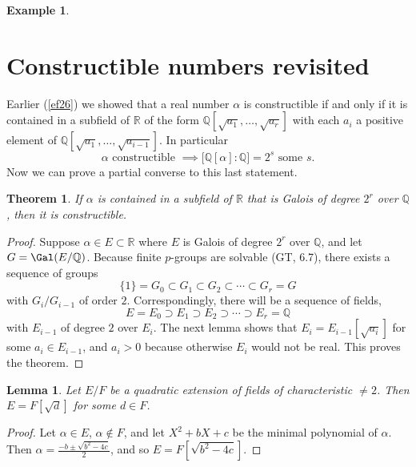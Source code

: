 \documentclass[a4paper,11pt,final,openany]{memoir}
\newtheorem{lemma}[X]{Lemma}
\newtheorem{theorem}[X]{Theorem}
\newtheorem{example}[X]{Example}
\theoremstyle{nonumberplain}
\newtheorem{proof}{Proof.}
\begin{document}
\begin{example}
\end{example}

\section{Constructible numbers revisited}

Earlier (\ref{ef26}) we showed that a real number $\alpha$ is constructible%
if and only if it is contained in a subfield of $\mathbb{R}{}$ of the form
$\mathbb{Q}[\sqrt{a_{1}},\ldots,\sqrt{a_{r}}]$ with each $a_{i}$ a positive
element of $\mathbb{Q}{}[\sqrt{a_{1}},\ldots,\sqrt{a_{i-1}}]$. In particular
\begin{equation}
\alpha\text{\ constructible }\implies\lbrack\mathbb{Q}[\alpha]\colon
\mathbb{Q}]=2^{s}\text{\ some }s. \label{e35}%
\end{equation}
Now we can prove a partial converse to this last statement.

\begin{theorem}
\label{ft22}%
%
If $\alpha$ is contained in a subfield of $\mathbb{R}{}$ that is Galois of
degree $2^{r}$ over $\mathbb{Q}$, then it is constructible.
\end{theorem}

\begin{proof}
Suppose $\alpha\in E\subset\mathbb{R}{}$ where $E$ is Galois of degree $2^{r}$
over $\mathbb{Q}$, and let $G=\Gal(E/\mathbb{Q})$. Because finite $p$-groups
are solvable (GT, 6.7), there exists a sequence of groups
\[
\{1\}=G_{0}\subset G_{1}\subset G_{2}\subset\cdots\subset G_{r}=G
\]
with $G_{i}/G_{i-1}$ of order $2$. Correspondingly, there will be a sequence
of fields,
\[
E=E_{0}\supset E_{1}\supset E_{2}\supset\cdots\supset E_{r}=\mathbb{Q}{}%
\]
with $E_{i-1}$ of degree $2$ over $E_{i}$. The next lemma shows that
$E_{i}=E_{i-1}[\sqrt{a_{i}}]$ for some $a_{i}\in E_{i-1}$, and $a_{i}>0$
because otherwise $E_{i}$ would not be real. This proves the theorem.
\end{proof}

\begin{lemma}
\label{ft23}Let $E/F$ be a quadratic extension of fields of characteristic
$\neq2$. Then $E=F[\sqrt{d}]$ for some $d\in F$.
\end{lemma}

\begin{proof}
Let $\alpha\in E$, $\alpha\notin F$, and let $X^{2}+bX+c$ be the minimal
polynomial of $\alpha$. Then $\alpha=\frac{-b\pm\sqrt{b^{2}-4c}}{2}$, and so
$E=F[\sqrt{b^{2}-4c}]$.
\end{proof}
\end{document}
